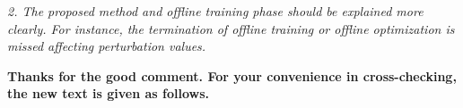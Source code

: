 \documentclass[12pt]{article}
\begin{document}

\textit{2. The proposed method and offline training phase should be explained more clearly. For instance, the termination of offline training or offline optimization is missed affecting perturbation values.}

\textbf{Thanks for the good comment. For your convenience in cross-checking, the new text is given as follows.}
\end{document}
